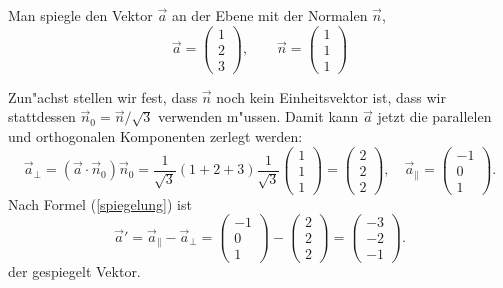 \begin{beispiel}
Man spiegle den Vektor $\vec a$ an der Ebene mit der Normalen $\vec n$,
\[
\vec a=\begin{pmatrix}1\\2\\3\end{pmatrix},
\qquad
\vec n=\begin{pmatrix}1\\1\\1\end{pmatrix}
\]

\smallskip

{\parindent 0pt Zun"achst stellen wir fest,} dass $\vec n$ noch
kein Einheitsvektor ist, dass wir stattdessen $\vec n_0=\vec n/\sqrt{3}$
verwenden m"ussen. Damit kann $\vec a$ jetzt die parallelen und orthogonalen
Komponenten zerlegt werden:
\[
\vec a_{\perp}=(\vec a\cdot\vec n_0)\vec n_0
=\frac1{\sqrt{3}} (1+2+3)\frac1{\sqrt{3}}\begin{pmatrix}1\\1\\1\end{pmatrix}
=\begin{pmatrix}2\\2\\2\end{pmatrix},
\quad
\vec a_{\|}=\begin{pmatrix} -1\\0\\1 \end{pmatrix}.
\]
Nach Formel (\ref{spiegelung}) ist
\[
\vec a'=\vec a_{\|}-\vec a_{\perp}
=
\begin{pmatrix}-1\\0\\1\end{pmatrix}-\begin{pmatrix}2\\2\\2\end{pmatrix}
=\begin{pmatrix}-3\\-2\\-1\end{pmatrix}.
\]
der gespiegelt Vektor.
\end{beispiel}


